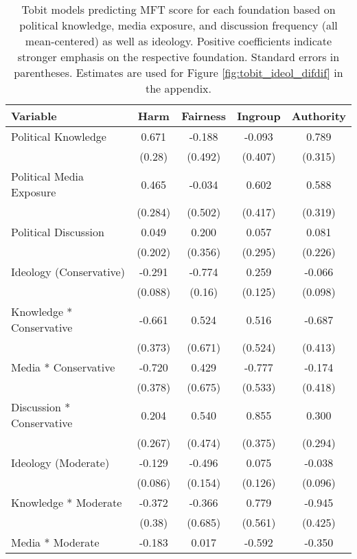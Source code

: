 \begin{table}[ht]
\centering
\caption{Tobit models predicting MFT score for each foundation based 
           on political knowledge, media exposure, and discussion frequency (all mean-centered)
           as well as ideology. Positive coefficients indicate stronger emphasis on the respective
           foundation. Standard errors in parentheses. Estimates are used for Figure
           \ref{fig:tobit_ideol_difdif} in the appendix.} 
\label{tab:tobit_ideol_difdif}
\begingroup\footnotesize
\begin{tabular}{lcccc}
  \hline
Variable & Harm & Fairness & Ingroup & Authority \\ 
  \hline
Political Knowledge &  0.671 & -0.188 & -0.093 &  0.789 \\ 
   & (0.28) & (0.492) & (0.407) & (0.315) \\ 
  Political Media Exposure &  0.465 & -0.034 &  0.602 &  0.588 \\ 
   & (0.284) & (0.502) & (0.417) & (0.319) \\ 
  Political Discussion &  0.049 &  0.200 &  0.057 &  0.081 \\ 
   & (0.202) & (0.356) & (0.295) & (0.226) \\ 
  Ideology (Conservative) & -0.291 & -0.774 &  0.259 & -0.066 \\ 
   & (0.088) & (0.16) & (0.125) & (0.098) \\ 
  Knowledge * Conservative & -0.661 &  0.524 &  0.516 & -0.687 \\ 
   & (0.373) & (0.671) & (0.524) & (0.413) \\ 
  Media * Conservative & -0.720 &  0.429 & -0.777 & -0.174 \\ 
   & (0.378) & (0.675) & (0.533) & (0.418) \\ 
  Discussion * Conservative &  0.204 &  0.540 &  0.855 &  0.300 \\ 
   & (0.267) & (0.474) & (0.375) & (0.294) \\ 
  Ideology (Moderate) & -0.129 & -0.496 &  0.075 & -0.038 \\ 
   & (0.086) & (0.154) & (0.126) & (0.096) \\ 
  Knowledge * Moderate & -0.372 & -0.366 &  0.779 & -0.945 \\ 
   & (0.38) & (0.685) & (0.561) & (0.425) \\ 
  Media * Moderate & -0.183 &  0.017 & -0.592 & -0.350 \\ 

\end{tabular}
\end{table}
